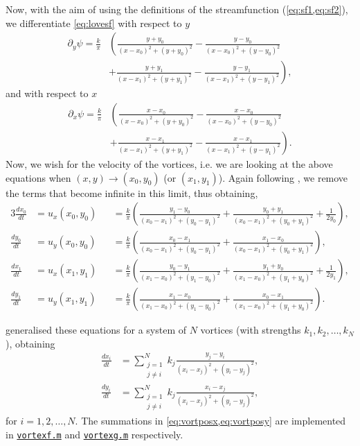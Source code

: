 \documentclass[10pt, a4paper]{article}
\numberwithin{equation}{section}
\begin{document}
Now, with the aim of using the definitions of the streamfunction (\cref{eq:sf1,eq:sf2}), we differentiate \cref{eq:lovesf} with respect to $y$
\begin{align}
\partial_y \psi = \frac{k}{\pi}&\left(\frac{y+y_0}{(x-x_0)^2 + (y+y_0)^2}-\frac{y-y_0}{(x-x_0)^2 + (y-y_0)^2}\right.\nonumber\\&\left.+\frac{y+y_1}{(x-x_1)^2 + (y+y_1)^2}-\frac{y-y_1}{(x-x_1)^2 + (y-y_1)^2}\right),
\label{eq:lovesfdy}
\end{align}
and with respect to $x$
\begin{align}
\partial_x \psi = \frac{k}{\pi}&\left(\frac{x-x_0}{(x-x_0)^2 + (y+y_0)^2}-\frac{x-x_0}{(x-x_0)^2 + (y-y_0)^2}\right.\nonumber\\&\left.+\frac{x-x_1}{(x-x_1)^2 + (y+y_1)^2}-\frac{x-x_1}{(x-x_1)^2 + (y-y_1)^2}\right).
\label{eq:lovesfdx}
\end{align}
Now, we wish for the velocity of the vortices, i.e. we are looking at the above equations when $(x,y)\rightarrow(x_0,y_0)$ (or $(x_1,y_1)$).
Again following \citeauthor{love94}, we remove the terms that become infinite in this limit, thus obtaining,
\begin{alignat}{3}
\frac{dx_0}{dt}&=u_x (x_0,y_0)&&= \frac{k}{\pi} \left( \frac{y_1-y_0}{(x_0-x_1)^2 + (y_0-y_1)^2} + \frac{y_0+y_1}{(x_0-x_1)^2 +(y_0+y_1)^2} + \frac{1}{2y_0}\right),\label{eq:vortm1}\\
\frac{dy_0}{dt}&=u_y (x_0,y_0)&&= \frac{k}{\pi} \left( \frac{x_0-x_1}{(x_0-x_1)^2 + (y_0-y_1)^2} + \frac{x_1-x_0}{(x_0-x_1)^2 +(y_0+y_1)^2}\right),\label{eq:vortm2}\\
\frac{dx_1}{dt}&=u_x (x_1,y_1)&&= \frac{k}{\pi} \left( \frac{y_0-y_1}{(x_1-x_0)^2 + (y_1-y_0)^2} + \frac{y_1+y_0}{(x_1-x_0)^2 +(y_1+y_0)^2} + \frac{1}{2y_1}\right),\label{eq:vortm3}\\
\frac{dy_1}{dt}&=u_y (x_1,y_1)&&= \frac{k}{\pi} \left( \frac{x_1-x_0}{(x_1-x_0)^2 + (y_1-y_0)^2} + \frac{x_0-x_1}{(x_1-x_0)^2 +(y_1+y_0)^2} \right).\label{eq:vortm4}
\end{alignat}

\citet{acheson00} generalised these equations for a system of $N$ vortices (with strengths $k_1,k_2,\ldots ,k_N$), obtaining
\begin{align}
\frac{dx_i}{dt}&=\sum^N_{\substack{j=1\\j\neq i}} k_j \frac{y_j - y_i}{(x_i - x_j)^2 + (y_i - y_j)^2},\label{eq:vortposx}\\
\frac{dy_i}{dt}&=\sum^N_{\substack{j=1\\j\neq i}} k_j \frac{x_i - x_j}{(x_i - x_j)^2 + (y_i - y_j)^2},\label{eq:vortposy}
\end{align}
for $i=1,2,\ldots, N$.
The summations in \cref{eq:vortposx,eq:vortposy} are implemented in \hyperref[vortexf]{\texttt{vortexf.m}} and \hyperref[vortexg]{\texttt{vortexg.m}} respectively.
\clearpage
\end{document}
